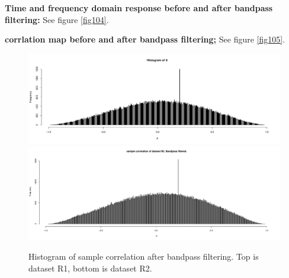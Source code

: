 \documentclass[12pt]{article}
\begin{document}
\textbf{Time and frequency domain response before and after bandpass filtering: } See figure \ref{fig104}.

\textbf{corrlation map before and after bandpass filtering; } See figure \ref{fig105}.


\begin{figure}[htb]
\includegraphics[width = 1\textwidth]{corr_hist_filtered}\\
\includegraphics[width = 1\textwidth]{figures2/corr_hist_filtered_R2}
\caption{Histogram of sample correlation after bandpass filtering. Top is dataset R1, bottom is dataset R2.}
\label{fig103}
\end{figure}
\end{document}
